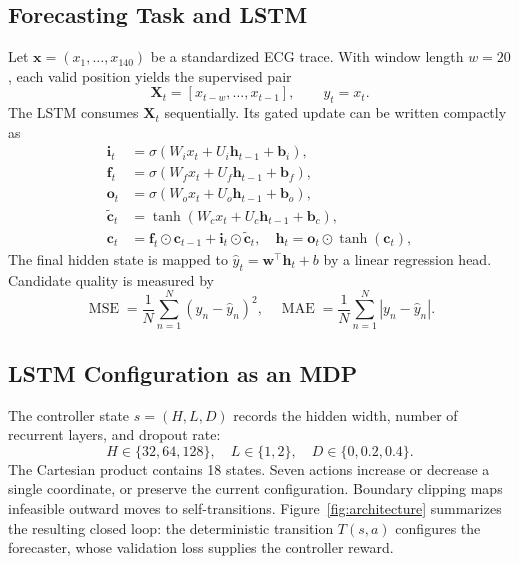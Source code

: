 \documentclass[conference]{IEEEtran}
\begin{document}
\subsection{Forecasting Task and LSTM}
Let $\mathbf{x}=(x_1,\ldots,x_{140})$ be a standardized ECG trace. With window length $w=20$, each valid position yields the supervised pair
\begin{equation}
    \mathbf{X}_{t}=[x_{t-w},\ldots,x_{t-1}],\qquad y_t=x_t.
    \label{eq:window}
\end{equation}
The LSTM consumes $\mathbf{X}_{t}$ sequentially. Its gated update can be written compactly as
\begin{align}
 \mathbf{i}_t &= \sigma(W_i x_t+U_i\mathbf{h}_{t-1}+\mathbf{b}_i), \nonumber\\
 \mathbf{f}_t &= \sigma(W_f x_t+U_f\mathbf{h}_{t-1}+\mathbf{b}_f), \nonumber\\
 \mathbf{o}_t &= \sigma(W_o x_t+U_o\mathbf{h}_{t-1}+\mathbf{b}_o), \nonumber\\
 \tilde{\mathbf{c}}_t &= \tanh(W_c x_t+U_c\mathbf{h}_{t-1}+\mathbf{b}_c), \nonumber\\
 \mathbf{c}_t &= \mathbf{f}_t\odot\mathbf{c}_{t-1}+\mathbf{i}_t\odot\tilde{\mathbf{c}}_t, \quad
 \mathbf{h}_t=\mathbf{o}_t\odot\tanh(\mathbf{c}_t),
 \label{eq:lstm}
\end{align}
The final hidden state is mapped to $\hat y_t=\mathbf{w}^{\top}\mathbf{h}_t+b$ by a linear regression head. Candidate quality is measured by
\begin{equation}
 \operatorname{MSE}=\frac{1}{N}\sum_{n=1}^{N}(y_n-\hat y_n)^2,
 \quad
 \operatorname{MAE}=\frac{1}{N}\sum_{n=1}^{N}|y_n-\hat y_n|.
 \label{eq:metrics}
\end{equation}

\subsection{LSTM Configuration as an MDP}
The controller state $s=(H,L,D)$ records the hidden width, number of recurrent layers, and dropout rate:
\begin{equation}
H\in\{32,64,128\},\quad L\in\{1,2\},\quad D\in\{0,0.2,0.4\}.
\end{equation}
The Cartesian product contains 18 states. Seven actions increase or decrease a single coordinate, or preserve the current configuration. Boundary clipping maps infeasible outward moves to self-transitions. Figure~\ref{fig:architecture} summarizes the resulting closed loop: the deterministic transition $T(s,a)$ configures the forecaster, whose validation loss supplies the controller reward.
\end{document}

